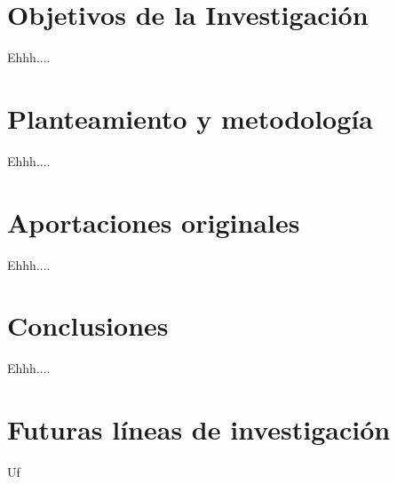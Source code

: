 

\section*{Objetivos de la Investigación}
Ehhh....

\section*{Planteamiento y metodología}
Ehhh....




\section*{Aportaciones originales}
Ehhh....


\section*{Conclusiones}

Ehhh....




\section*{Futuras líneas de investigación}
Uf



